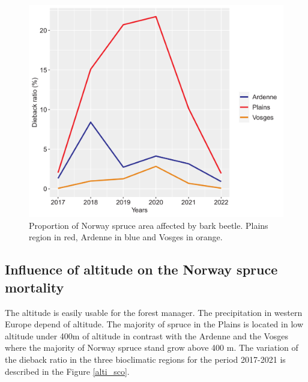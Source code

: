 \documentclass[3p,procedia]{elsarticle}
\begin{document}
\begin{figure}[htbp] 
   \centering
   \includegraphics[width=0.6 \textwidth]{Annual_evol_Ardennes_vosges_plaines.png}
    \caption{Proportion of Norway spruce area affected by bark beetle. Plains region in red, Ardenne in blue and Vosges in orange. }
    \label{evol_gen}
\end{figure}

    


\subsection{ Influence of altitude on the Norway spruce mortality}
The altitude is easily usable for the forest manager.
The precipitation in western Europe depend of altitude. 
The majority of spruce in the Plains is located in low altitude under 400m of altitude in contrast with the Ardenne and the Vosges where the majority of Norway spruce stand grow above 400 m. 
The variation of the dieback ratio in the three bioclimatic regions for the period 2017-2021 is described in the Figure \ref{alti_sco}.
\end{document}
